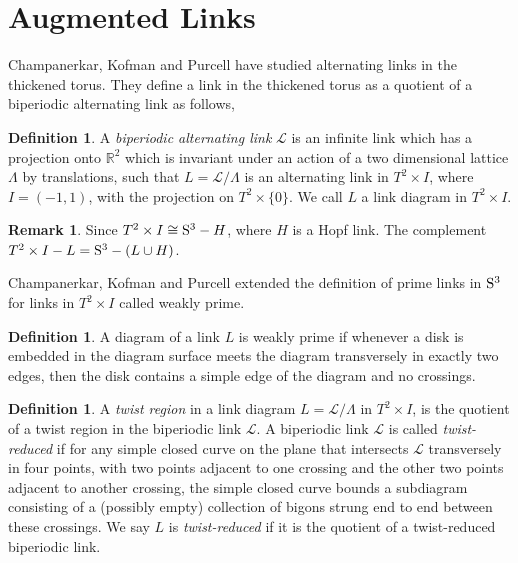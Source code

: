 \documentclass[11pt]{amsart}
\newcommand{\Sp}{{\rm{S}}}
\newcommand{\R}{\mathbb{R}}
\theoremstyle{plain}
\theoremstyle{definition}
\newtheorem{define}[theorem]{Definition}
\newtheorem{remark}[theorem]{Remark}
\begin{document}
 
\section{Augmented Links}
 Champanerkar, Kofman and Purcell have studied alternating links in the thickened torus. They define a link in the thickened torus as a quotient of a biperiodic alternating link as follows,
 
\begin{define}\cite{CKP2} \label{def:biperiodiclink}
 A \emph{biperiodic alternating link} $\mathcal{L}$ is an infinite link which has a projection onto $\R^2$ which is invariant under an action of a two dimensional lattice $\Lambda$ by translations, such that $L=\mathcal{L}/\Lambda$ is an alternating link in $T^2 \times I$, where $I = (-1,1)$, with the projection on $T^2 \times \{0\}$. We call $L$ a link diagram in $T^2 \times I$.   
\end{define}

\begin{remark}
Since $T^2 \times I \cong \Sp^3 - H$, where $H$ is a Hopf link. The complement $T^2 \times I- L = \Sp^3 - (L \cup H)$.
\end{remark}

Champanerkar, Kofman and Purcell \cite{CKP2} extended the definition of prime links in $\Sp^3$ for links in $T^2 \times I$ called weakly prime. 

 \begin{define} \label{def:weaklyprime}
A diagram of a link $L$ is weakly prime if whenever a disk is embedded in the diagram surface meets the diagram transversely in exactly two edges, then the disk contains a simple edge of the diagram and no crossings.
\end{define}


\begin{define}
A \emph{twist region} in a link diagram $L=\mathcal{L}/\Lambda$ in $T^2 \times I$, is the quotient of a twist region in the biperiodic link $\mathcal{L}$. %
A biperiodic link $\mathcal{L}$ is called \emph{twist-reduced} if for any simple closed curve on the plane that intersects $\mathcal{L}$ transversely in four points, with two points adjacent to one crossing and the other two points adjacent to another crossing, the simple closed
curve bounds a subdiagram consisting of a (possibly empty) collection of bigons
strung end to end between these crossings. We say $L$ is \emph{twist-reduced} if it is the quotient of a twist-reduced biperiodic link. 
\end{define}
\end{document}
